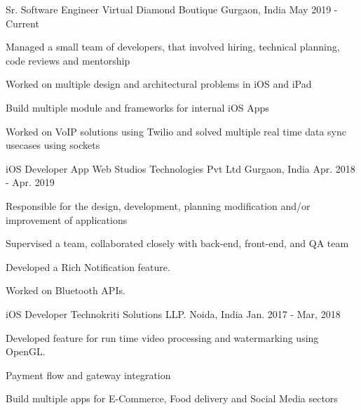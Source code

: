 


\begin{cventries}


\cventry
{Sr. Software Engineer} %
{Virtual Diamond Boutique} %
{Gurgaon, India} %
{May 2019 - Current} %
{ %
\begin{cvitems}
\item {Managed a small team of developers, that involved hiring, technical planning, code reviews and mentorship}
\item {Worked on multiple design and architectural problems in iOS and iPad }
\item {Build multiple module and frameworks for internal iOS Apps}
\item {Worked on VoIP solutions using Twilio and solved multiple real time data sync usecases using sockets }
\end{cvitems}
}


\cventry
{iOS Developer} %
{App Web Studios Technologies Pvt Ltd} %
{Gurgaon, India} %
{Apr. 2018 - Apr. 2019} %
{ %
\begin{cvitems}
\item {Responsible for the design, development, planning modification and/or improvement of applications}
\item {Supervised a team, collaborated closely with back-end, front-end, and QA team}
\item {Developed a Rich Notification feature.}
\item {Worked on Bluetooth APIs.}
\end{cvitems}
}


\cventry
{iOS Developer} %
{Technokriti Solutions LLP.} %
{Noida, India} %
{Jan. 2017 - Mar, 2018} %
{ %
\begin{cvitems}
\item {Developed feature for run time video processing and watermarking using OpenGL.}
\item {Payment flow and gateway integration}
\item {Build multiple apps for E-Commerce, Food delivery and Social Media sectors }
\end{cvitems} 
}


\end{cventries}
